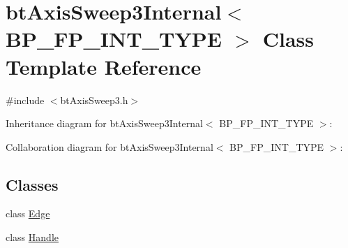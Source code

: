 \hypertarget{classbt_axis_sweep3_internal}{\section{bt\+Axis\+Sweep3\+Internal$<$ B\+P\+\_\+\+F\+P\+\_\+\+I\+N\+T\+\_\+\+T\+Y\+P\+E $>$ Class Template Reference}
\label{classbt_axis_sweep3_internal}
}


{\ttfamily \#include $<$bt\+Axis\+Sweep3.\+h$>$}



Inheritance diagram for bt\+Axis\+Sweep3\+Internal$<$ B\+P\+\_\+\+F\+P\+\_\+\+I\+N\+T\+\_\+\+T\+Y\+P\+E $>$\+:


Collaboration diagram for bt\+Axis\+Sweep3\+Internal$<$ B\+P\+\_\+\+F\+P\+\_\+\+I\+N\+T\+\_\+\+T\+Y\+P\+E $>$\+:
\subsection*{Classes}
\begin{DoxyCompactItemize}
\item 
class \hyperlink{classbt_axis_sweep3_internal_1_1_edge}{Edge}
\item 
class \hyperlink{classbt_axis_sweep3_internal_1_1_handle}{Handle}
\end{DoxyCompactItemize}
